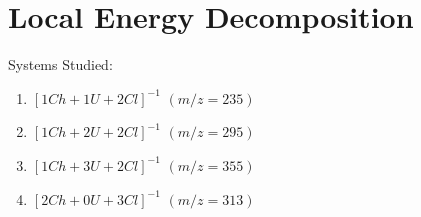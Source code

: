\section{Local Energy Decomposition}
Systems Studied:

\begin{enumerate}
    \item $[1Ch+1U+2Cl]^{-1}$ $(m/z = 235)$
    \item $[1Ch+2U+2Cl]^{-1}$ $(m/z = 295)$
    \item $[1Ch+3U+2Cl]^{-1}$ $(m/z = 355)$
    \item $[2Ch+0U+3Cl]^{-1}$ $(m/z = 313)$
\end{enumerate}